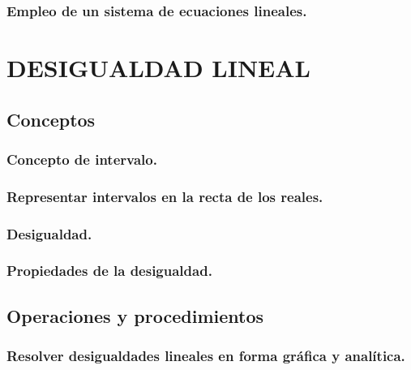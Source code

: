\subsubsection{Empleo de un sistema de ecuaciones lineales.}





\section{DESIGUALDAD LINEAL} %
\subsection{Conceptos}
\subsubsection{Concepto de intervalo.}
\subsubsection{Representar intervalos en la recta de los reales.}
\subsubsection{Desigualdad.}
\subsubsection{Propiedades de la desigualdad.}
\subsection{Operaciones y procedimientos}
\subsubsection{Resolver desigualdades lineales en forma gráfica y analítica.}

